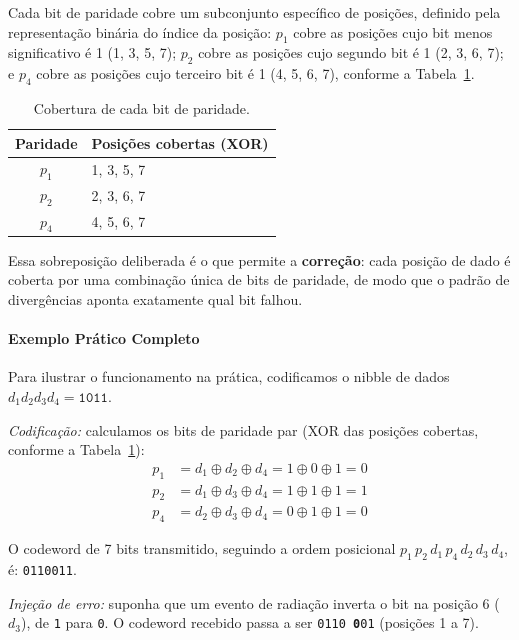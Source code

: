 \documentclass[12pt,a4paper]{article}
\begin{document}
Cada bit de paridade cobre um subconjunto específico de posições, definido 
pela representação binária do índice da posição: $p_1$ cobre as posições 
cujo bit menos significativo é 1 (1, 3, 5, 7); $p_2$ cobre as posições cujo 
segundo bit é 1 (2, 3, 6, 7); e $p_4$ cobre as posições cujo terceiro bit é 
1 (4, 5, 6, 7), conforme a Tabela~\ref{tab:hamming_cobertura}.

\begin{table}[htpb]
\centering
\caption{Cobertura de cada bit de paridade.}
\label{tab:hamming_cobertura}
\begin{tabular}{cl}
\toprule
\textbf{Paridade} & \textbf{Posições cobertas (XOR)} \\
\midrule
$p_1$ & 1, 3, 5, 7 \\
$p_2$ & 2, 3, 6, 7 \\
$p_4$ & 4, 5, 6, 7 \\
\bottomrule
\end{tabular}
\end{table}

Essa sobreposição deliberada é o que permite a \textbf{correção}: cada 
posição de dado é coberta por uma combinação única de bits de paridade, de 
modo que o padrão de divergências aponta exatamente qual bit falhou.

\paragraph{Exemplo Prático Completo}
Para ilustrar o funcionamento na prática, codificamos o nibble de dados 
$d_1d_2d_3d_4 = \texttt{1011}$.

\textit{Codificação:} calculamos os bits de paridade par (XOR das posições 
cobertas, conforme a Tabela~\ref{tab:hamming_cobertura}):
\begin{align*}
    p_1 &= d_1 \oplus d_2 \oplus d_4 = 1 \oplus 0 \oplus 1 = 0 \\
    p_2 &= d_1 \oplus d_3 \oplus d_4 = 1 \oplus 1 \oplus 1 = 1 \\
    p_4 &= d_2 \oplus d_3 \oplus d_4 = 0 \oplus 1 \oplus 1 = 0
\end{align*}

O codeword de 7 bits transmitido, seguindo a ordem posicional 
$p_1\,p_2\,d_1\,p_4\,d_2\,d_3\,d_4$, é: \texttt{0110011}.

\textit{Injeção de erro:} suponha que um evento de radiação inverta o bit 
na posição 6 ($d_3$), de \texttt{1} para \texttt{0}. O codeword recebido 
passa a ser \texttt{0110\,\textbf{0}01} (posições 1 a 7).
\end{document}
